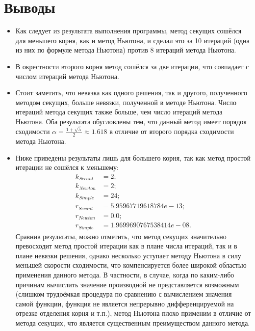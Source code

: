 \documentclass[14pt, a4paper]{article}
\begin{document}
  \section{Выводы}
  \begin{itemize}
  \item
  Как следует из результата выполнения программы, метод секущих сошёлся для меньшего корня, как и метод Ньютона, и сделал это за 10 итераций (одна из них по формуле метода Ньютона) против 8 итераций метода Ньютона.
  \item
  В окрестности второго корня метод сошёлся за две итерации, что совпадает с числом итераций метода Ньютона.
  \item
  Стоит заметить, что невязка как одного решения, так и другого, полученного методом секущих, больше невязки, полученной в методе Ньютона. Число итераций метода секущих также больше, чем число итераций метода Ньютона.
  Оба результата обусловлены тем, что данный метод имеет порядок сходимости $\alpha = \frac{1 + \sqrt{5}}{2} \approx 1.618$ в отличие от второго порядка сходимости метода Ньютона.
  \item
  Ниже приведены результаты лишь для большего корня, так как метод простой итерации не сошёлся к меньшему:
  \begin{align*}
  k_{Secant} &= 2; \\
  k_{Newton} &= 2; \\
  k_{Simple} &= 24; \\ 
  r_{Secant} &= 5.95967719618784e-13; \\
  r_{Newton} &= 0.0; \\
  r_{Simple} &= 1.9699690767538414e-08.
  \end{align*}
  Сравнив результаты, можно отметить, что метод секущих значительно превосходит метод простой итерации как в плане числа итераций, так и в плане невязки решения, однако несколько уступает методу Ньютона в силу меньшей скорости сходимости, что компенсируется более широкой областью применения данного метода.
  В частности, в случае, когда по каким-либо причинам вычислить значение производной не представляется возможным (слишком трудоёмкая процедура по сравнению с вычислением значения самой функции, функция не является непрерывно дифференцируемой на отрезке отделения корня и т.п.), метод Ньютона плохо применим
  в отличие от метода секущих, что является существенным преимуществом данного метода.  
  \end{itemize}
\end{document}
